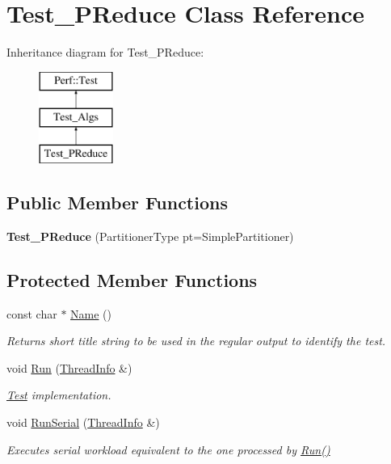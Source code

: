 \hypertarget{classTest__PReduce}{}\section{Test\+\_\+\+P\+Reduce Class Reference}
\label{classTest__PReduce}
Inheritance diagram for Test\+\_\+\+P\+Reduce\+:\begin{figure}[H]
\begin{center}
\leavevmode
\includegraphics[height=3.000000cm]{classTest__PReduce}
\end{center}
\end{figure}
\subsection*{Public Member Functions}
\begin{DoxyCompactItemize}
\item 
\hypertarget{classTest__PReduce_ae76d400b7cb35befda80f13a8c35a1ad}{}{\bfseries Test\+\_\+\+P\+Reduce} (Partitioner\+Type pt=Simple\+Partitioner)\label{classTest__PReduce_ae76d400b7cb35befda80f13a8c35a1ad}

\end{DoxyCompactItemize}
\subsection*{Protected Member Functions}
\begin{DoxyCompactItemize}
\item 
const char $\ast$ \hyperlink{classTest__PReduce_aff89ac590b2a62b7ea161e70a2a55eaf}{Name} ()
\begin{DoxyCompactList}\small\item\em Returns short title string to be used in the regular output to identify the test. \end{DoxyCompactList}\item 
void \hyperlink{classTest__PReduce_ad442376e26a571efe467cd7a4cec9832}{Run} (\hyperlink{structPerf_1_1Test_1_1ThreadInfo}{Thread\+Info} \&)
\begin{DoxyCompactList}\small\item\em \hyperlink{classTest}{Test} implementation. \end{DoxyCompactList}\item 
void \hyperlink{classTest__PReduce_a0e5c4680eb9bbae63adeb7cf4891bcef}{Run\+Serial} (\hyperlink{structPerf_1_1Test_1_1ThreadInfo}{Thread\+Info} \&)
\begin{DoxyCompactList}\small\item\em Executes serial workload equivalent to the one processed by \hyperlink{classTest__PReduce_ad442376e26a571efe467cd7a4cec9832}{Run()} \end{DoxyCompactList}\end{DoxyCompactItemize}
